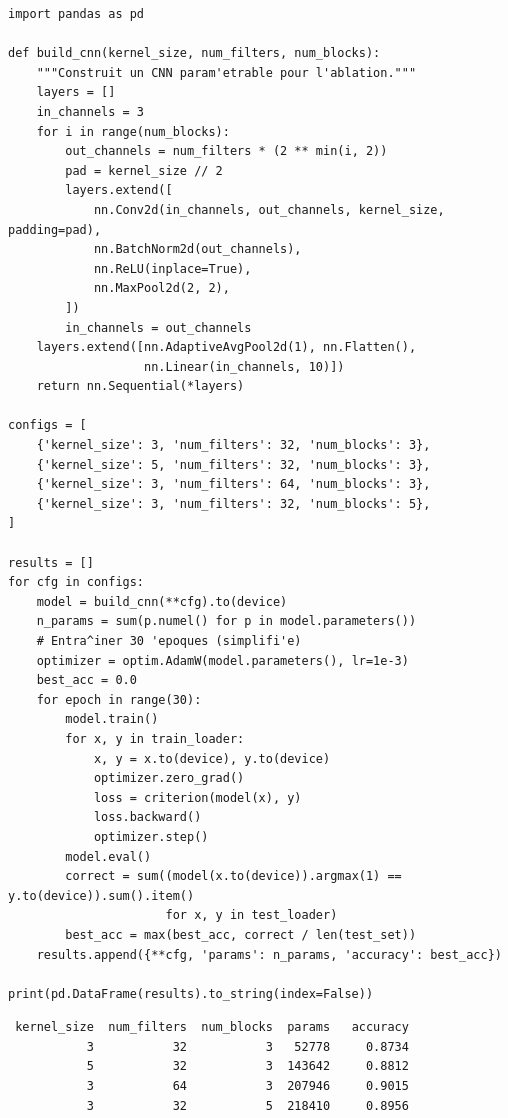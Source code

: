 \begin{codeblock}[title=\textbf{Ablation : taille du noyau, nombre de filtres, profondeur}]
\begin{verbatim}
import pandas as pd

def build_cnn(kernel_size, num_filters, num_blocks):
    """Construit un CNN param'etrable pour l'ablation."""
    layers = []
    in_channels = 3
    for i in range(num_blocks):
        out_channels = num_filters * (2 ** min(i, 2))
        pad = kernel_size // 2
        layers.extend([
            nn.Conv2d(in_channels, out_channels, kernel_size, padding=pad),
            nn.BatchNorm2d(out_channels),
            nn.ReLU(inplace=True),
            nn.MaxPool2d(2, 2),
        ])
        in_channels = out_channels
    layers.extend([nn.AdaptiveAvgPool2d(1), nn.Flatten(),
                   nn.Linear(in_channels, 10)])
    return nn.Sequential(*layers)

configs = [
    {'kernel_size': 3, 'num_filters': 32, 'num_blocks': 3},
    {'kernel_size': 5, 'num_filters': 32, 'num_blocks': 3},
    {'kernel_size': 3, 'num_filters': 64, 'num_blocks': 3},
    {'kernel_size': 3, 'num_filters': 32, 'num_blocks': 5},
]

results = []
for cfg in configs:
    model = build_cnn(**cfg).to(device)
    n_params = sum(p.numel() for p in model.parameters())
    # Entra^iner 30 'epoques (simplifi'e)
    optimizer = optim.AdamW(model.parameters(), lr=1e-3)
    best_acc = 0.0
    for epoch in range(30):
        model.train()
        for x, y in train_loader:
            x, y = x.to(device), y.to(device)
            optimizer.zero_grad()
            loss = criterion(model(x), y)
            loss.backward()
            optimizer.step()
        model.eval()
        correct = sum((model(x.to(device)).argmax(1) == y.to(device)).sum().item()
                      for x, y in test_loader)
        best_acc = max(best_acc, correct / len(test_set))
    results.append({**cfg, 'params': n_params, 'accuracy': best_acc})

print(pd.DataFrame(results).to_string(index=False))
\end{verbatim}
\end{codeblock}

\begin{codeoutput}
\begin{verbatim}
 kernel_size  num_filters  num_blocks  params   accuracy
           3           32           3   52778     0.8734
           5           32           3  143642     0.8812
           3           64           3  207946     0.9015
           3           32           5  218410     0.8956
\end{verbatim}
\end{codeoutput}

